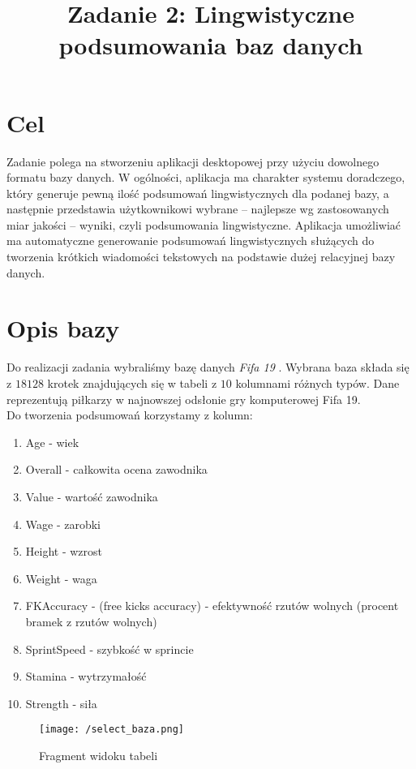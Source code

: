 \documentclass{classrep}
\author{
  \studentinfo{Piotr Traczyk}{195733} \and
  \studentinfo{Bartosz Jurczewski}{210209}
}
\title{Zadanie 2: Lingwistyczne podsumowania baz danych}
\begin{document}
\maketitle


\section{Cel}
Zadanie polega na stworzeniu aplikacji desktopowej przy użyciu dowolnego formatu bazy danych. W ogólności, aplikacja ma charakter systemu doradczego, który generuje pewną ilość podsumowań lingwistycznych dla podanej bazy, a następnie przedstawia użytkownikowi wybrane – najlepsze wg zastosowanych miar jakości – wyniki, czyli podsumowania lingwistyczne. Aplikacja umożliwiać ma automatyczne generowanie podsumowań lingwistycznych służących do tworzenia krótkich wiadomości tekstowych na podstawie dużej relacyjnej bazy danych. \cite{tresc}


\section{Opis bazy}
Do realizacji zadania wybraliśmy bazę danych \emph{Fifa 19} \cite{data}. Wybrana baza
składa się z \(18128\) krotek znajdujących się w tabeli z \(10\) kolumnami różnych typów. Dane reprezentują piłkarzy w najnowszej odsłonie gry komputerowej Fifa 19.\\ Do tworzenia podsumowań
korzystamy z kolumn:
\begin{enumerate}
    \item Age - wiek
    \item Overall - całkowita ocena zawodnika
    \item Value - wartość zawodnika
    \item Wage - zarobki
    \item Height - wzrost
    \item Weight - waga
    \item FKAccuracy - (free kicks accuracy) - efektywność rzutów wolnych (procent bramek z rzutów wolnych)
    \item SprintSpeed - szybkość w sprincie
    \item Stamina - wytrzymałość
    \item Strength - siła
\end{enumerate}

\begin{figure}[H]
    \centering
    \texttt{[image: /select\_baza.png]}
    \caption{Fragment widoku tabeli}
\end{figure}
\end{document}
